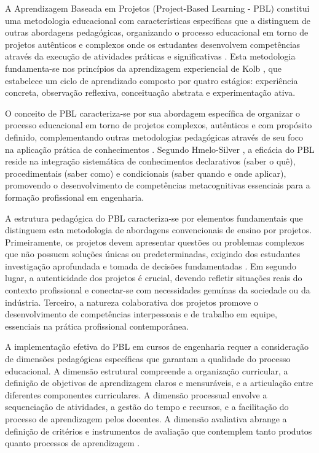 \documentclass[12pt, a4paper, oneside]{abntex2}
\begin{document}
A Aprendizagem Baseada em Projetos (Project-Based Learning - PBL) constitui uma metodologia educacional com características específicas que a distinguem de outras abordagens pedagógicas, organizando o processo educacional em torno de projetos autênticos e complexos onde os estudantes desenvolvem competências através da execução de atividades práticas e significativas \cite{thomas2000, savery2015}. Esta metodologia fundamenta-se nos princípios da aprendizagem experiencial de Kolb \cite{kolb1984}, que estabelece um ciclo de aprendizado composto por quatro estágios: experiência concreta, observação reflexiva, conceituação abstrata e experimentação ativa.

O conceito de PBL caracteriza-se por sua abordagem específica de organizar o processo educacional em torno de projetos complexos, autênticos e com propósito definido, complementando outras metodologias pedagógicas através de seu foco na aplicação prática de conhecimentos \cite{duch2001}. Segundo Hmelo-Silver \cite{hmelo2004}, a eficácia do PBL reside na integração sistemática de conhecimentos declarativos (saber o quê), procedimentais (saber como) e condicionais (saber quando e onde aplicar), promovendo o desenvolvimento de competências metacognitivas essenciais para a formação profissional em engenharia.

A estrutura pedagógica do PBL caracteriza-se por elementos fundamentais que distinguem esta metodologia de abordagens convencionais de ensino por projetos. Primeiramente, os projetos devem apresentar questões ou problemas complexos que não possuem soluções únicas ou predeterminadas, exigindo dos estudantes investigação aprofundada e tomada de decisões fundamentadas \cite{savery2015}. Em segundo lugar, a autenticidade dos projetos é crucial, devendo refletir situações reais do contexto profissional e conectar-se com necessidades genuínas da sociedade ou da indústria. Terceiro, a natureza colaborativa dos projetos promove o desenvolvimento de competências interpessoais e de trabalho em equipe, essenciais na prática profissional contemporânea.

A implementação efetiva do PBL em cursos de engenharia requer a consideração de dimensões pedagógicas específicas que garantam a qualidade do processo educacional. A dimensão estrutural compreende a organização curricular, a definição de objetivos de aprendizagem claros e mensuráveis, e a articulação entre diferentes componentes curriculares. A dimensão processual envolve a sequenciação de atividades, a gestão do tempo e recursos, e a facilitação do processo de aprendizagem pelos docentes. A dimensão avaliativa abrange a definição de critérios e instrumentos de avaliação que contemplem tanto produtos quanto processos de aprendizagem \cite{thomas2000}.
\end{document}
